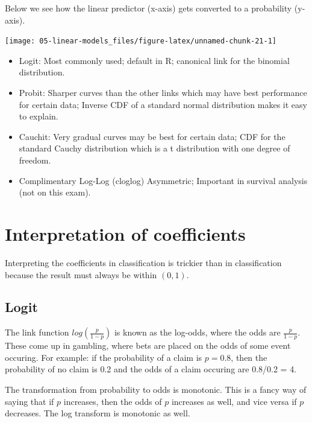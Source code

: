 \documentclass[openany]{book}
\providecommand{\tightlist}{%
  \setlength{\itemsep}{0pt}\setlength{\parskip}{0pt}}
\begin{document}
Below we see how the linear predictor (x-axis) gets converted to a probability (y-axis).

\begin{center}\texttt{[image: 05-linear-models\_files/figure-latex/unnamed-chunk-21-1]} \end{center}

\begin{itemize}
\tightlist
\item
  {Logit: } Most commonly used; default in R; canonical link for the binomial distribution.
\item
  {Probit: } Sharper curves than the other links which may have best performance for certain data; Inverse CDF of a standard normal distribution makes it easy to explain.
\item
  {Cauchit: } Very gradual curves may be best for certain data; CDF for the standard Cauchy distribution which is a t distribution with one degree of freedom.
\item
  {Complimentary Log-Log (cloglog)} Asymmetric; Important in survival analysis (not on this exam).
\end{itemize}

\hypertarget{interpretation-of-coefficients-1}{%
\section{Interpretation of coefficients}\label{interpretation-of-coefficients-1}}

Interpreting the coefficients in classification is trickier than in classification because the result must always be within \((0,1)\).

\hypertarget{logit}{%
\subsection{Logit}\label{logit}}

The link function \(log(\frac{p}{1-p})\) is known as the log-odds, where the odds are \(\frac{p}{1-p}\). These come up in gambling, where bets are placed on the odds of some event occuring. For example: if the probability of a claim is \(p = 0.8\), then the probability of no claim is 0.2 and the odds of a claim occuring are 0.8/0.2 = 4.

The transformation from probability to odds is monotonic. This is a fancy way of saying that if \(p\) increases, then the odds of \(p\) increases as well, and vice versa if \(p\) decreases. The log transform is monotonic as well.
\end{document}
